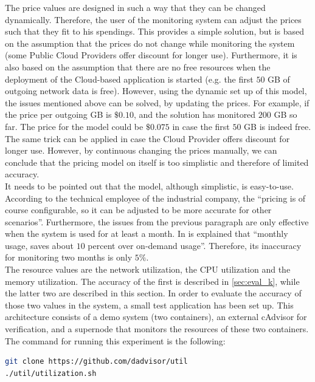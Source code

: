 \noindent
The price values are designed in such a way that they can be changed dynamically. Therefore, the user of the monitoring system can adjust the prices such that they fit to his spendings. This provides a simple solution, but is based on the assumption that the prices do not change while monitoring the system (some Public Cloud Providers offer discount for longer use). Furthermore, it is also based on the assumption that there are no free resources when the deployment of the Cloud-based application is started (e.g. the first $50$ GB of outgoing network data is free). However, using the dynamic set up of this model, the issues mentioned above can be solved, by updating the prices. For example, if the price per outgoing GB is $\$0.10$, and the solution has monitored $200$ GB so far. The price for the model could be $\$0.075$ in case the first $50$ GB is indeed free. The same trick can be applied in case the Cloud Provider offers discount for longer use. However, by continuous changing the prices manually, we can conclude that the pricing model on itself is too simplistic and therefore of limited accuracy.\\

\noindent
It needs to be pointed out that the model, although simplistic, is easy-to-use. According to the technical employee of the industrial company, the ``pricing is of course configurable, so it can be adjusted to be more accurate for other scenarios''. Furthermore, the issues from the previous paragraph are only effective when the system is used for at least a month. In \cite{infoworld} is explained that ``monthly usage, saves about $10$ percent over on-demand usage''. Therefore, its inaccuracy for monitoring two months is only $5\%$.\\

\noindent
The resource values are the network utilization, the CPU utilization and the memory utilization. The accuracy of the first is described in \autoref{sec:eval_k}, while the latter two are described in this section. In order to evaluate the accuracy of those two values in the system, a small test application has been set up. This architecture consists of a demo system (two containers), an external cAdvisor for verification, and a supernode that monitors the resources of these two containers. The command for running this experiment is the following:

\begin{lstlisting}[language=bash, caption=Docker-compose]
git clone https://github.com/dadvisor/util
./util/utilization.sh
\end{lstlisting}

